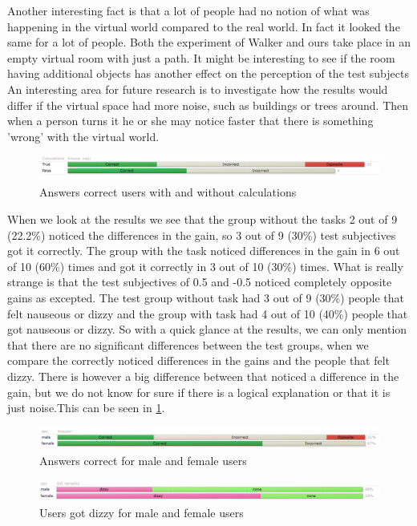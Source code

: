 Another interesting fact is that a lot of people had no notion of what was happening in the virtual world compared to the real world.
In fact it looked the same for a lot of people.
Both the experiment of Walker \cite{jwalker} and ours take place in an empty virtual room with just a path.
It might be interesting to see if the room having additional objects has another effect on the perception of the test subjects
An interesting area for future research is to investigate how the results would differ if the virtual space had more noise, such as buildings or trees around.
Then when a person turns it he or she may notice faster that there is something 'wrong'  with the virtual world.
\begin{figure}[htb]
	\centering
	\includegraphics[width=\linewidth]{sections/finalreport/images/graph3.png}	
	\caption{Answers correct users with and without calculations}
	\label{fig:grp3}
\end{figure}
When we look at the results we see that the group without the tasks 2 out of 9 (22.2\%) noticed the differences in the gain, so 3 out of 9 (30\%)  test subjectives got it correctly.  The group with the task noticed differences in the gain in 6 out of 10 (60\%) times and got it correctly in 3 out of 10 (30\%) times. What is really strange is that the test subjectives of 0.5 and -0.5 noticed completely opposite gains as excepted. The test group without task had 3 out of 9 (30\%) people that felt nauseous or dizzy and the group with task had 4 out of 10 (40\%) people that got nauseous or dizzy. So with a quick glance at the results, we can only mention that there are no significant differences between the test groups, when we compare the correctly noticed differences in the gains and the people that felt dizzy. There is however a big difference between that noticed a difference in the gain, but we do not know for sure if there is a logical explanation or that it is just noise.This can be seen in \ref{fig:grp3}.
\begin{figure}[htb]
	\centering
	\includegraphics[width=\linewidth]{sections/finalreport/images/graph5.png}	
	\caption{Answers correct for male and female users}
	\label{fig:grp4}
\end{figure}
\begin{figure}[htb]
	\centering
	\includegraphics[width=\linewidth]{sections/finalreport/images/graph4.png}	
	\caption{Users got dizzy for male and female users}
	\label{fig:grp5}
\end{figure}

